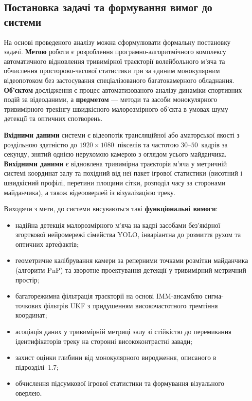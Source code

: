 \subsection{Постановка задачі та формування вимог до системи}

На основі проведеного аналізу можна сформулювати формальну постановку задачі.
\textbf{Метою} роботи є розроблення програмно-алгоритмічного комплексу автоматичного
відновлення тривимірної траєкторії волейбольного м'яча та обчислення просторово-часової
статистики гри за єдиним монокулярним відеопотоком без застосування спеціалізованого
багатокамерного обладнання. \textbf{Об'єктом} дослідження є процес автоматизованого
аналізу динаміки спортивних подій за відеоданими, а \textbf{предметом} --- методи та
засоби монокулярного тривимірного трекінгу швидкісного малорозмірного об'єкта в умовах
шуму детекції та оптичних спотворень.

\textbf{Вхідними даними} системи є відеопотік трансляційної або аматорської якості з
роздільною здатністю до $1920\times1080$~пікселів та частотою $30$--$50$~кадрів за
секунду, знятий однією нерухомою камерою з оглядом усього майданчика. \textbf{Вихідними
даними} є відновлена тривимірна траєкторія м'яча у метричній системі координат залу та
похідний від неї пакет ігрової статистики (висотний і швидкісний профілі, перетини
площини сітки, розподіл часу за сторонами майданчика), а також відеооверлей із
візуалізацією треку.

Виходячи з мети, до системи висуваються такі \textbf{функціональні вимоги}:
\begin{itemize}
    \item надійна детекція малорозмірного м'яча на кадрі засобами без'якірної згорткової
    нейромережі сімейства \gls{YOLO}, інваріантна до розмиття рухом та оптичних артефактів;
    \item геометричне калібрування камери за реперними точками розмітки майданчика
    (алгоритм \gls{PnP}) та зворотне проектування детекції у тривимірний метричний простір;
    \item багаторежимна фільтрація траєкторії на основі \gls{IMM}-ансамблю сигма-точкових
    фільтрів \gls{UKF} з придушенням високочастотного тремтіння координат;
    \item асоціація даних у тривимірній метриці залу зі стійкістю до перемикання
    ідентифікаторів треку на сторонні висококонтрастні завади;
    \item захист оцінки глибини від монокулярного виродження, описаного в підрозділі~1.7;
    \item обчислення підсумкової ігрової статистики та формування візуального оверлею.
\end{itemize}

